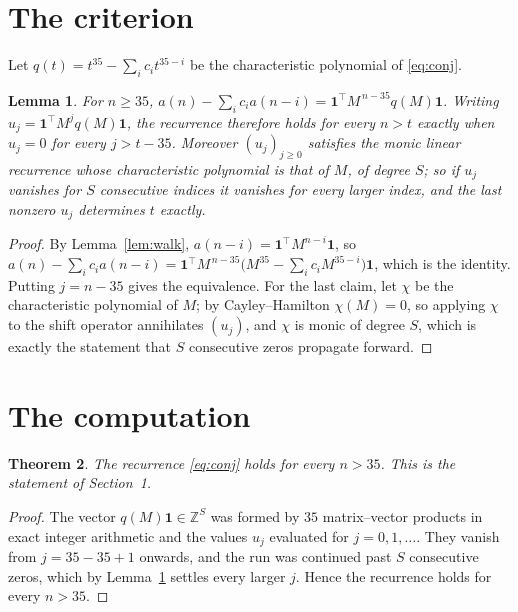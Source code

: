 \documentclass[11pt,a4paper]{article}
\theoremstyle{plain}
\newtheorem{theorem}{Theorem}
\newtheorem{lemma}[theorem]{Lemma}
\theoremstyle{definition}
\begin{document}
\section{The criterion}

Let $q(t)=t^{35}-\sum_i c_i t^{35-i}$ be the characteristic polynomial of
\eqref{eq:conj}.

\begin{lemma}\label{lem:crit}
For $n\ge35$,
$a(n)-\sum_i c_i a(n-i)=\mathbf{1}^{\!\top}M^{\,n-35}q(M)\mathbf{1}$. Writing
$u_j=\mathbf{1}^{\!\top}M^{j}q(M)\mathbf{1}$, the recurrence therefore holds for every
$n>t$ exactly when $u_j=0$ for every $j>t-35$. Moreover $(u_j)_{j\ge0}$ satisfies the
monic linear recurrence whose characteristic polynomial is that of $M$, of degree $S$; so
if $u_j$ vanishes for $S$ consecutive indices it vanishes for every larger index, and the
last nonzero $u_j$ determines $t$ exactly.
\end{lemma}

\begin{proof}
By Lemma~\ref{lem:walk}, $a(n-i)=\mathbf{1}^{\!\top}M^{n-i}\mathbf{1}$, so
$a(n)-\sum_i c_i a(n-i)
=\mathbf{1}^{\!\top}M^{\,n-35}\bigl(M^{35}-\sum_i c_i M^{35-i}\bigr)
\mathbf{1}$, which is the identity. Putting $j=n-35$ gives the equivalence. For the
last claim, let $\chi$ be the characteristic polynomial of $M$; by Cayley--Hamilton
$\chi(M)=0$, so applying $\chi$ to the shift operator annihilates $(u_j)$, and $\chi$ is
monic of degree $S$, which is exactly the statement that $S$ consecutive zeros propagate
forward.
\end{proof}

\section{The computation}

\begin{theorem}
The recurrence \eqref{eq:conj} holds for every $n>35$. This is the statement of
Section~1.
\end{theorem}

\begin{proof}
The vector $q(M)\mathbf{1}\in\mathbb{Z}^{S}$ was formed by $35$ matrix--vector
products in exact integer arithmetic and the values $u_j$ evaluated for
$j=0,1,\dots$. They vanish from $j=35-35+1$ onwards, and the run was continued past
$S$ consecutive zeros, which by Lemma~\ref{lem:crit} settles every larger $j$. Hence the
recurrence holds for every $n>35$.
\end{proof}
\end{document}
